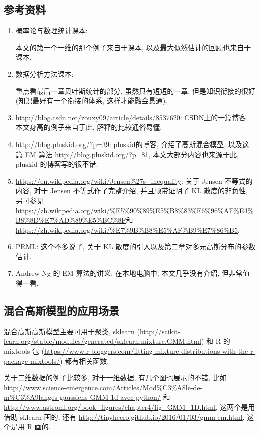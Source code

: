 \documentclass[a4paper,UTF8]{ctexart}
\theoremstyle{plain} \newtheorem{theorem}{定理}[section]
\theoremstyle{plain} \newtheorem{definition}{定义}[section]
\theoremstyle{plain} \newtheorem{lemma}{引理}[section]
\theoremstyle{plain} \newtheorem{proposition}{命题}[section]
\theoremstyle{plain} \newtheorem{example}{例}
\theoremstyle{plain} \newtheorem{remark}{注}
\theoremstyle{plain} \newtheorem{corollary}{推论}[section]
\begin{document}
\subsection{参考资料}
\begin{enumerate}[(1)]
\item 概率论与数理统计课本:

本文的第一个一维的那个例子来自于课本, 以及最大似然估计的回顾也来自于课本.

\item 数据分析方法课本:

重点看最后一章贝叶斯统计的部分, 虽然只有短短的一章, 但是知识衔接的很好(知识最好有一个衔接的体系, 这样才能融会贯通).

\item \url{http://blog.csdn.net/zouxy09/article/details/8537620}: CSDN上的一篇博客, 本文身高的例子来自于此, 解释的比较通俗易懂.

\item \url{http://blog.pluskid.org/?p=39}: pluskid的博客, 介绍了高斯混合模型, 以及这篇 EM 算法 \url{http://blog.pluskid.org/?p=81}, 本文大部分内容也来源于此, pluskid 的博客写的很不错.

\item \url{https://en.wikipedia.org/wiki/Jensen%27s_inequality}: 关于 Jensen 不等式的内容, 对于 Jensen 不等式作了完整介绍, 并且顺带证明了 KL 散度的非负性, 另可参见 \url{https://zh.wikipedia.org/wiki/%E5%90%89%E5%B8%83%E6%96%AF%E4%B8%8D%E7%AD%89%E5%BC%8F}和 \url{https://zh.wikipedia.org/wiki/%E7%9B%B8%E5%AF%B9%E7%86%B5}.

\item PRML: 这个不多说了, 关于 KL 散度的引入以及第二章对多元高斯分布的参数估计.

\item Andrew Ng 的 EM 算法的讲义: 在本地电脑中, 本文几乎没有介绍, 但非常值得一看.

\end{enumerate}



\subsection{混合高斯模型的应用场景}
混合高斯高斯模型主要可用于聚类, sklearn (\url{http://scikit-learn.org/stable/modules/generated/sklearn.mixture.GMM.html}) 和 R 的 mixtools 包 (\url{https://www.r-bloggers.com/fitting-mixture-distributions-with-the-r-package-mixtools/}) 都有相关函数.

关于二维数据的例子比较多, 对于一维数据, 有几个图也展示的不错, 比如 \url{http://www.science-emergence.com/Articles/Mod%C3%A8le-de-m%C3%A9langes-gaussiens-GMM-1d-avec-python/} 和 \url{http://www.astroml.org/book_figures/chapter4/fig_GMM_1D.html}, 这两个是用借助 sklearn 画的, 还有 \url{http://tinyheero.github.io/2016/01/03/gmm-em.html}, 这个是用 R 画的.
\end{document}
